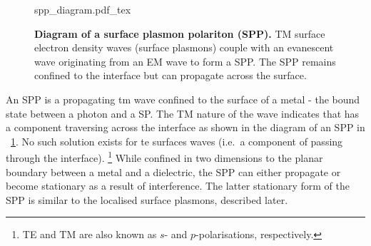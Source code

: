 \documentclass{article}
\begin{document}
\begin{figure}[bt]
\fontsize{10pt}{1em}\selectfont
\def\svgwidth{0.6\textwidth}
{spp_diagram.pdf_tex}
\caption[Diagram of a surface plasmon polariton (SPP)]{\textbf{Diagram of a surface plasmon polariton (SPP).} TM surface electron density waves (surface plasmons) couple with an evanescent wave originating from an EM wave to form a SPP. The SPP remains confined to the interface but can propagate across the surface.}
\label{fig:spp_diagram}
\end{figure}

An SPP is a propagating \gls{tm} wave confined to the surface of a metal - the bound state between a photon and a SP. The TM nature of the wave indicates that  has a component traversing across the interface as shown in the diagram of an SPP in \figurename~\ref{fig:spp_diagram}. No such solution exists for \gls{te} surfaces waves (i.e.\ a component of  passing through the interface).%
\footnote{TE and TM are also known as $s$- and $p$-polarisations, respectively.}
While confined in two dimensions to the planar boundary between a metal and a dielectric, the SPP can either propagate or become stationary as a result of interference. The latter stationary form of the SPP is similar to the localised surface plasmons, described later.
\end{document}
